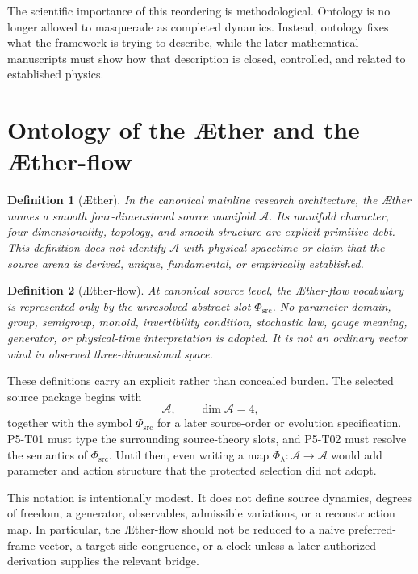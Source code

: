 \documentclass[11pt]{article}
\newcommand{\Aether}{\AE{}ther}
\newcommand{\Aflow}{\AE{}ther-flow}
\newcommand{\Sub}{\mathcal{A}}
\newcommand{\PhiSrc}{\Phi_{\mathrm{src}}}
\newtheorem{definition}{Definition}
\begin{document}
The scientific importance of this reordering is methodological. Ontology is no longer allowed to masquerade as completed dynamics. Instead, ontology fixes what the framework is trying to describe, while the later mathematical manuscripts must show how that description is closed, controlled, and related to established physics.

\section{Ontology of the \Aether{} and the \Aflow{}}

\begin{definition}[\Aether{}]
In the canonical mainline research architecture, the \Aether{} names a smooth
four-dimensional source manifold \(\Sub\). Its manifold character,
four-dimensionality, topology, and smooth structure are explicit primitive
debt. This definition does not identify \(\Sub\) with physical spacetime or
claim that the source arena is derived, unique, fundamental, or empirically
established.
\end{definition}

\begin{definition}[\Aflow{}]
At canonical source level, the \Aflow{} vocabulary is represented only by the
unresolved abstract slot \(\PhiSrc\). No parameter domain, group, semigroup,
monoid, invertibility condition, stochastic law, gauge meaning, generator, or
physical-time interpretation is adopted. It is not an ordinary vector wind in
observed three-dimensional space.
\end{definition}

These definitions carry an explicit rather than concealed burden. The selected
source package begins with
\[
\Sub,
\qquad
\dim \Sub = 4,
\]
together with the symbol \(\PhiSrc\) for a later source-order or evolution
specification. P5-T01 must type the surrounding source-theory slots, and
P5-T02 must resolve the semantics of \(\PhiSrc\). Until then, even writing a
map \(\Phi_\lambda:\Sub\to\Sub\) would add parameter and action structure that
the protected selection did not adopt.

This notation is intentionally modest. It does not define source dynamics,
degrees of freedom, a generator, observables, admissible variations, or a
reconstruction map. In particular, the \Aflow{} should not be reduced to a
naive preferred-frame vector, a target-side congruence, or a clock unless a
later authorized derivation supplies the relevant bridge.
\end{document}
